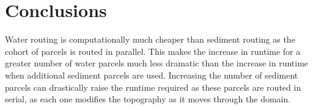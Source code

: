 \section{Conclusions}
Water routing is computationally much cheaper than sediment routing as the cohort of parcels is routed in parallel.
This makes the increase in runtime for a greater number of water parcels much less dramatic than the increase in runtime when additional sediment parcels are used.
Increasing the number of sediment parcels can drastically raise the runtime required as these parcels are routed in serial, as each one modifies the topography as it moves through the domain.

\clearpage

